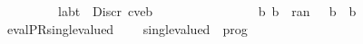\begin{isabellebody}
\ \ \ \ \ \ \ {\isasymand}\ {\isacharparenleft}{\isasymforall}\ {\isacharparenleft}{\isacharparenleft}lab{\isacharcomma}{\isasymbeta}{\isacharparenright}{\isacharcomma}t{\isacharparenright}\ {\isasymin}\ {\isasymC}{\isasymcdot}{\isacharparenleft}Discr\ {\isacharparenleft}c{\isacharcomma}{\isasymbeta}{\isacharprime}{\isacharcomma}ve{\isacharcomma}b{\isacharparenright}{\isacharparenright}{\isachardot}\isanewline
\ \ \ \ \ \ \ \ \ \ \ \ \ \ \ {\isasymexists}\ b{\isacharprime}{\isachardot}\ b{\isacharprime}\ {\isasymin}\ ran\ {\isasymbeta}\ {\isasymand}\ b\ {\isasymle}\ b{\isacharprime}{\isacharparenright}\isanewline
\ \ \ \ \ \ \ {\isacharparenright}{\isachardoublequoteclose}\isanewline
%
\isadelimproof
%
\endisadelimproof
\isanewline
{}\isamarkupfalse%
\ evalPR{\isacharunderscore}single{\isacharunderscore}valued{\isacharcolon}\isanewline%
\ \ \ \  {\isachardoublequoteopen}single{\isacharunderscore}valued\ {\isacharparenleft}{\isasymPR}\ prog{\isacharparenright}{\isachardoublequoteclose}\isanewline

\end{isabellebody}%

